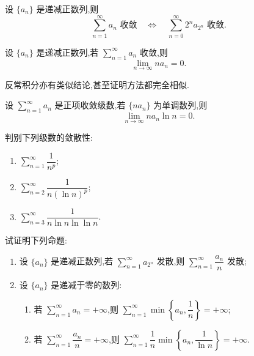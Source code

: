 \documentclass[../数学分析培优讲义.tex]{subfiles}
\begin{document}

\begin{theorem}
设 $\{a_n\}$ 是递减正数列,则
\[
    \sum\limits_{n=1}^{\infty}a_n\text{ 收敛}
    \quad\Longleftrightarrow\quad
    \sum\limits_{n=0}^{\infty}2^na_{2^n}\text{ 收敛}.
\]
\end{theorem}

\begin{proposition}[\markstar]
设 $\{a_n\}$ 是递减正数列,若 $\displaystyle\sum\limits_{n=1}^{\infty}a_n$ 收敛,则
\[
    \lim\limits_{n\to\infty}na_n=0.
\]
\end{proposition}

\begin{remark}
反常积分亦有类似结论,甚至证明方法都完全相似.
\end{remark}

\begin{example}
设 $\displaystyle\sum\limits_{n=1}^{\infty}a_n$ 是正项收敛级数,若 $\{na_n\}$ 为单调数列,则
\[
    \lim\limits_{n\to\infty}na_n\ln n=0.
\]
\end{example}
\exampleblank

\begin{example}
判别下列级数的敛散性:
\begin{enumerate}[label=(\arabic*)]
    \item $\displaystyle\sum\limits_{n=1}^{\infty}\dfrac{1}{n^p}$;
    \item $\displaystyle\sum\limits_{n=2}^{\infty}\dfrac{1}{n(\ln n)^p}$;
    \item $\displaystyle\sum\limits_{n=3}^{\infty}\dfrac{1}{n\ln n\ln\ln n}$.
\end{enumerate}
\end{example}
\exampleblank

\begin{example}
试证明下列命题:
\begin{enumerate}[label=(\arabic*)]
    \item 设 $\{a_n\}$ 是递减正数列,若 $\displaystyle\sum\limits_{n=1}^{\infty}a_{2^n}$ 发散,则 $\displaystyle\sum\limits_{n=1}^{\infty}\dfrac{a_n}{n}$ 发散;
    \item 设 $\{a_n\}$ 是递减于零的数列:
    \begin{enumerate}[label=(\roman*)]
        \item 若 $\displaystyle\sum\limits_{n=1}^{\infty}a_n=+\infty$,则 $\displaystyle\sum\limits_{n=1}^{\infty}\min\left\{a_n,\dfrac{1}{n}\right\}=+\infty$;
        \item 若 $\displaystyle\sum\limits_{n=1}^{\infty}\dfrac{a_n}{n}=+\infty$,则 $\displaystyle\sum\limits_{n=1}^{\infty}\dfrac{1}{n}\min\left\{a_n,\dfrac{1}{\ln n}\right\}=+\infty$.
    \end{enumerate}
\end{enumerate}
\end{example}
\exampleblank
\end{document}
